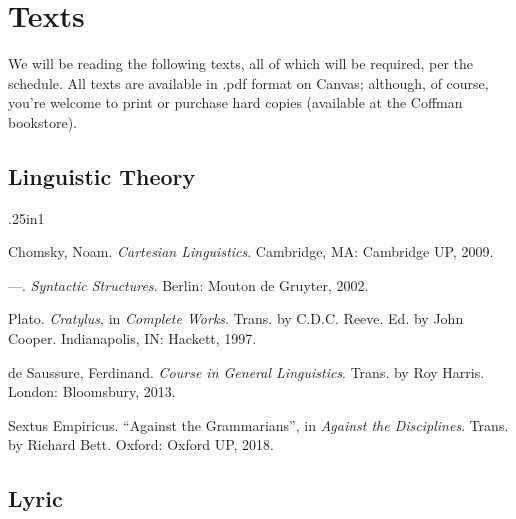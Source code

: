 \documentclass[12pt]{article}
\begin{document}
\section{Texts}
We will be reading the following texts, all of which will be required, per the schedule. All texts are available in .pdf format on Canvas; although, of course, you're welcome to print or purchase hard copies (available at the Coffman bookstore).

\subsection{Linguistic Theory}
\begin{hangparas}{.25in}{1} \small{
    Chomsky, Noam. \textit{Cartesian Linguistics}. Cambridge, MA: Cambridge UP, 2009.
    
    ---. \textit{Syntactic Structures}. Berlin: Mouton de Gruyter, 2002.
    
    Plato. \textit{Cratylus}, in \textit{Complete Works}. Trans. by C.D.C. Reeve. Ed. by John Cooper. Indianapolis, IN: Hackett, 1997.
    
    de Saussure, Ferdinand. \textit{Course in General Linguistics}. Trans. by Roy Harris. London: Bloomsbury, 2013.
    
    Sextus Empiricus. ``Against the Grammarians'', in \textit{Against the Disciplines}. Trans. by Richard Bett. Oxford: Oxford UP, 2018.
    
}
    
\end{hangparas}
\noindent

\subsection{Lyric}
\end{document}
